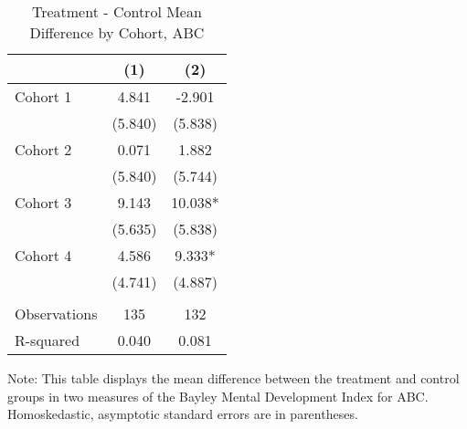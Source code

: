 \begin{table}[H] 
\centering 
\begin{threeparttable}
\caption{Treatment - Control Mean Difference by Cohort, ABC}
\label{table:cohorts}
\begin{tabular}{lcc} \toprule
 & (1) & (2) \\
 \midrule
Cohort 1 & 4.841 & -2.901 \\
 & (5.840) & (5.838) \\
Cohort 2 & 0.071 & 1.882 \\
 & (5.840) & (5.744) \\
Cohort 3 & 9.143 & 10.038* \\
 & (5.635) & (5.838) \\
Cohort 4 & 4.586 & 9.333* \\
 & (4.741) & (4.887) \\
 &  &  \\
 \midrule
Observations & 135 & 132 \\
 R-squared & 0.040 & 0.081 \\ 
 \bottomrule
 \end{tabular}
\begin{tablenotes}
\footnotesize 
\item Note: This table displays the mean difference between the treatment and control groups in two measures of the Bayley Mental Development Index for ABC. Homoskedastic, asymptotic standard errors are in parentheses.
\end{tablenotes}
\end{threeparttable}
\end{table}
